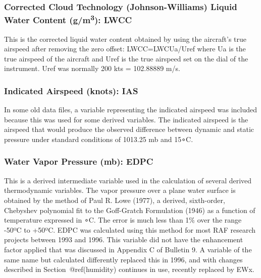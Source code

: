 \documentclass[
  english,
]{book}
\begin{document}
\hypertarget{jwlw-corrected}{%
\subsubsection*{\texorpdfstring{Corrected Cloud Technology
(Johnson-Williams) Liquid Water Content (g/m\textsuperscript{3}):
LWCC}{Corrected Cloud Technology (Johnson-Williams) Liquid Water Content (g/m3): LWCC}}\label{jwlw-corrected}}

This is the corrected liquid water content obtained by using the
aircraft's true airspeed after removing the zero offset:
LWCC=LWC{Ua/Uref} where {Ua} is the true airspeed of the aircraft and
{Uref} is the true airspeed set on the dial of the instrument. {Uref}
was normally 200 kts = 102.88889 m/s.

\hypertarget{ias}{%
\subsubsection*{Indicated Airspeed (knots): IAS}\label{ias}}

In some old data files, a variable representing the indicated airspeed
was included because this was used for some derived variables. The
indicated airspeed is the airspeed that would produce the observed
difference between dynamic and static pressure under standard conditions
of 1013.25 mb and {15∘}C.

\hypertarget{edpc}{%
\subsubsection*{Water Vapor Pressure (mb): EDPC}\label{edpc}}

This is a derived intermediate variable used in the calculation of
several derived thermodynamic variables. The vapor pressure over a plane
water surface is obtained by the method of Paul R. Lowe (1977), a
derived, sixth-order, Chebyshev polynomial fit to the Goff-Gratch
Formulation (1946) as a function of temperature expressed in {∘C}. The
error is much less than 1\% over the range -50{º}C to +50{º}C. EDPC was
calculated using this method for most RAF research projects between 1993
and 1996. This variable did not have the enhancement factor applied that
was discussed in Appendix C of Bulletin 9. A variable of the same name
but calculated differently replaced this in 1996, and with changes
described in Section~@ref(humidity) continues in use, recently replaced
by EWx.
\end{document}
